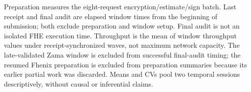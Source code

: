 \begin{table}[!t]
\begin{tabular}{|l|r|l|r|r|r|r|r|}
\hline
\end{tabular}
\par\smallskip
\begin{minipage}{\textwidth}\scriptsize Preparation measures the eight-request encryption/estimate/sign batch. Last receipt and final audit are elapsed window times from the beginning of submission; both exclude preparation and window setup. Final audit is not an isolated FHE execution time. Throughput is the mean of window throughput values under receipt-synchronized waves, not maximum network capacity. The late-validated Zama window is excluded from successful final-audit timing; the resumed Fhenix preparation is excluded from preparation summaries because its earlier partial work was discarded. Means and CVs pool two temporal sessions descriptively, without causal or inferential claims.\end{minipage}
\end{table}

